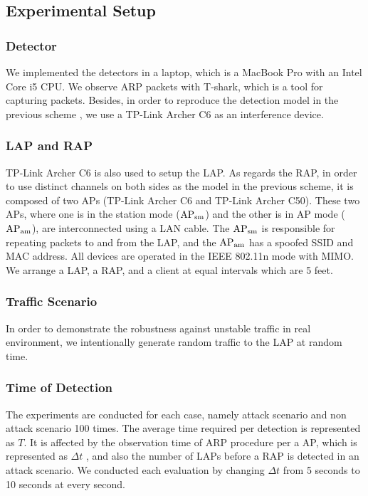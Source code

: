 \documentclass[conference]{IEEEtran}
\begin{document}
\subsection{Experimental Setup}
\subsubsection{Detector}
We implemented the detectors in a laptop, which is a MacBook Pro with an Intel Core i5 CPU.
We observe ARP packets with T-shark, which is a tool for capturing packets\cite{wire}.
Besides, in order to reproduce the detection model in the previous scheme \cite{previous}, we use a TP-Link Archer C6 as an interference device.

\subsubsection{LAP and RAP}
TP-Link Archer C6 is also used to setup the LAP.
As regards the RAP, in order to use distinct channels on both sides as the model in the previous scheme, it is composed of two APs (TP-Link Archer C6 and TP-Link Archer C50).
These two APs, where one is in the station mode ($\rm AP_{sm}$) and the other is in AP mode ($\rm AP_{am}$), are interconnected using a LAN cable.
The $\rm AP_{sm}$ is responsible for repeating packets to and from the LAP, and the $\rm AP_{am}$ has a spoofed SSID and MAC address.
All devices are operated in the IEEE 802.11n mode with MIMO.
We arrange a LAP, a RAP, and a client at equal intervals which are 5 feet.

\subsubsection{Traffic Scenario}
In order to demonstrate the robustness against unstable traffic in real environment, we intentionally generate random traffic to the LAP at random time.

\subsubsection{Time of Detection}
The experiments are conducted for each case, namely attack scenario and non attack scenario 100 times.
The average time required per detection is represented as $T$.
It is affected by the observation time of ARP procedure per a AP, which is represented as $\Delta t$ , and also the number of LAPs before a RAP is detected in an attack scenario.
We conducted each evaluation by changing $\Delta t$ from 5 seconds to 10 seconds at every second.
\end{document}
